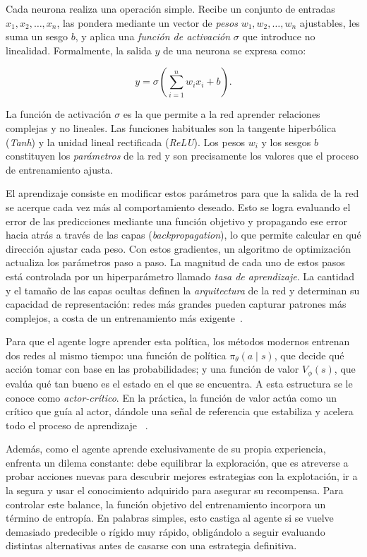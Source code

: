 Cada neurona realiza una operación simple. Recibe un conjunto de entradas $x_1, x_2, \dots, x_n$, las pondera mediante un vector de \textit{pesos} $w_1, w_2, \dots, w_n$ ajustables, les suma un sesgo $b$, y aplica una \textit{función de activación} $\sigma$ que introduce no linealidad. Formalmente, la salida $y$ de una neurona se expresa como:

\begin{equation}
    \label{eq:neurona}
    y = \sigma\left( \sum_{i=1}^{n} w_i x_i + b \right).
\end{equation}

La función de activación $\sigma$ es la que permite a la red aprender relaciones complejas y no lineales. Las funciones habituales son la tangente hiperbólica (\textit{Tanh}) y la unidad lineal rectificada (\textit{ReLU}). Los pesos $w_i$ y los sesgos $b$ constituyen los \textit{parámetros} de la red y son precisamente los valores que el proceso de entrenamiento ajusta.

El aprendizaje consiste en modificar estos parámetros para que la salida de la red se acerque cada vez más al comportamiento deseado. Esto se logra evaluando el error de las predicciones mediante una función objetivo y propagando ese error hacia atrás a través de las capas (\textit{backpropagation}), lo que permite calcular en qué dirección ajustar cada peso. Con estos gradientes, un algoritmo de optimización actualiza los parámetros paso a paso. La magnitud de cada uno de estos pasos está controlada por un hiperparámetro llamado \textit{tasa de aprendizaje}. La cantidad y el tamaño de las capas ocultas definen la \textit{arquitectura} de la red y determinan su capacidad de representación: redes más grandes pueden capturar patrones más complejos, a costa de un entrenamiento más exigente~\cite{Goodfellow2016}.


Para que el agente logre aprender esta política, los métodos modernos entrenan dos redes al mismo tiempo: una función de política $\pi_\theta(a \mid s)$, que decide qué acción tomar con base en las probabilidades; y una función de valor $V_\phi(s)$, que evalúa qué tan bueno es el estado en el que se encuentra. A esta estructura se le conoce como \textit{actor-crítico}. En la práctica, la función de valor actúa como un crítico que guía al actor, dándole una señal de referencia que estabiliza y acelera todo el proceso de aprendizaje ~\cite{SuttonBarto2014}.

Además, como el agente aprende exclusivamente de su propia experiencia, enfrenta un dilema constante: debe equilibrar la exploración, que es atreverse a probar acciones nuevas para descubrir mejores estrategias con la explotación, ir a la segura y usar el conocimiento adquirido para asegurar su recompensa. Para controlar este balance, la función objetivo del entrenamiento incorpora un término de entropía. En palabras simples, esto castiga al agente si se vuelve demasiado predecible o rígido muy rápido, obligándolo a seguir evaluando distintas alternativas antes de casarse con una estrategia definitiva.


